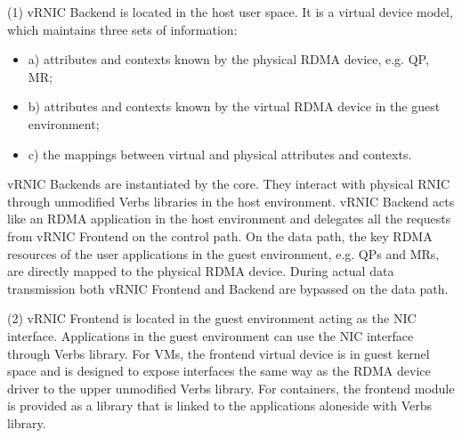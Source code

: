 
(1) vRNIC Backend is located in the host user space. It is a virtual device model, which maintains three sets of information:
\begin{itemize}
	\item a) attributes and contexts known by the physical RDMA device, e.g. QP, MR;
	\item b) attributes and contexts known by the virtual RDMA device in the guest environment;
	\item c) the mappings between virtual and physical attributes and contexts.
\end{itemize}
vRNIC Backends are instantiated by the \sys core. They interact with physical RNIC through unmodified Verbs libraries in the host environment. vRNIC Backend acts like an RDMA application in the host environment and delegates all the requests from vRNIC Frontend on the control path. On the data path, the key RDMA resources of the user applications in the guest environment, e.g. QPs and MRs, are directly mapped to the physical RDMA device. During actual data transmission both vRNIC Frontend and Backend are bypassed on the data path.


(2) vRNIC Frontend is located in the guest environment acting as the NIC interface. Applications in the guest environment can use the NIC interface through Verbs library. For VMs, the frontend virtual device is in guest kernel space and is designed to expose interfaces the same way as the RDMA device driver to the upper unmodified Verbs library. For containers, the frontend module is provided as a library that is linked to the applications aloneside with Verbs library.


